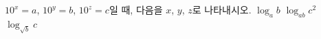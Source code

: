 $10^x=a$, $10^y=b$, $10^z=c$일 때, 다음을 $x$, $y$, $z$로 나타내시오. 
 $\log_a b$
 $\log_{ab} c^2$
 $\log_{\sqrt{b}} c$

